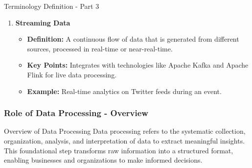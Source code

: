\documentclass[aspectratio=169]{beamer}
\begin{document}
\begin{frame}[fragile]{Terminology Definition - Part 3}
\begin{enumerate}
        \item \textbf{Streaming Data}
        \begin{itemize}
            \item \textbf{Definition:} A continuous flow of data that is generated from different sources, processed in real-time or near-real-time.
            \item \textbf{Key Points:} Integrates with technologies like Apache Kafka and Apache Flink for live data processing.
            \item \textbf{Example:} Real-time analytics on Twitter feeds during an event.
        \end{itemize}
    \end{enumerate}
\end{frame}

\begin{frame}[fragile]
    \frametitle{Role of Data Processing - Overview}
    \begin{block}{Overview of Data Processing}
        Data processing refers to the systematic collection, organization, analysis, and interpretation of data to extract meaningful insights. This foundational step transforms raw information into a structured format, enabling businesses and organizations to make informed decisions.
    \end{block}
\end{frame}
\end{document}
